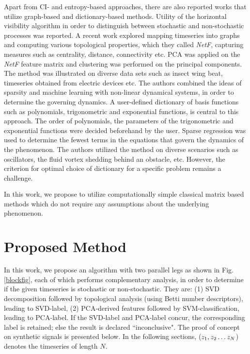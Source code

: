 \documentclass[journal]{IEEEtran}
\begin{document}
	Apart from CI- and entropy-based approaches, there are also reported works that utilize graph-based and dictionary-based methods. Utility of the horizontal visibility algorithm \cite{lacasa2010} in order to distinguish between stochastic and non-stochastic processes was reported. A recent work explored \cite{Silva2022} mapping timeseries into  graphs and computing various topological properties, which they called \textit{NetF}, capturing  measures such as centrality, distance, connectivity etc. PCA was applied on the \textit{NetF} feature matrix and clustering was performed on the principal components. The method was illustrated on diverse data sets such as insect wing beat, timeseries obtained from electric devices etc. The authors \cite{Brunton2016} combined the ideas of sparsity and machine learning with non-linear dynamical systems, in order to determine the governing dynamics. A user-defined dictionary of basis functions such as polynomials, trigonometric and exponential functions, is central to this approach. The order of polynomials, the parameters of the trigonometric and exponential functions were decided beforehand by the user. Sparse regression was used to determine the fewest terms in the equations that govern the dynamics of the phenomenon. The authors utilized the method on diverse scenarios such as oscillators, the fluid vortex shedding behind an obstacle, etc. However, the criterion for optimal choice of dictionary for a specific problem remains a challenge.
	
	In this work, we propose to utilize computationally simple classical matrix based methods which do not require any assumptions about the underlying phenomenon.
	
	\section{Proposed Method}
	
	In this work, we propose an algorithm with two parallel legs as shown in Fig. \ref{blockfig}, each of which performs complementary analysis, in order to determine if the given timeseries is stochastic or non-stochastic. They are: (1) SVD decomposition followed by topological analysis (using Betti number descriptors), leading to SVD-label, (2) PCA-derived features followed by SVM-classification, leading to PCA-label. If the SVD-label and PCA-label concur, the corresponding label is retained; else the result is declared ``inconclusive". The proof of concept on synthetic signals is presented below. In the following sections, ($z_1, z_2 \mathellipsis z_N$) denotes the timeseries of length $N$.
	
\end{document}
